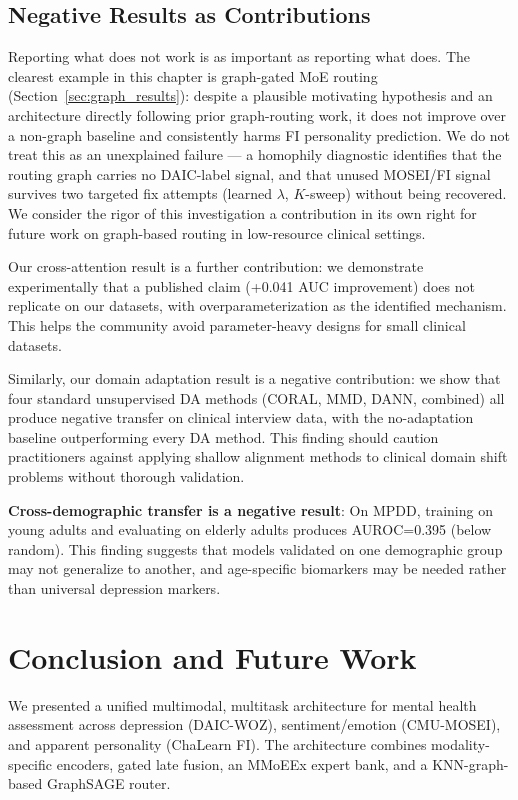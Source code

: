 \documentclass[12pt,oneside]{book}
\begin{document}
\subsection{Negative Results as Contributions}

Reporting what does not work is as important as reporting what does. The clearest example in this chapter is graph-gated MoE routing (Section~\ref{sec:graph_results}): despite a plausible motivating hypothesis and an architecture directly following prior graph-routing work, it does not improve over a non-graph baseline and consistently harms FI personality prediction. We do not treat this as an unexplained failure — a homophily diagnostic identifies that the routing graph carries no DAIC-label signal, and that unused MOSEI/FI signal survives two targeted fix attempts (learned $\lambda$, $K$-sweep) without being recovered. We consider the rigor of this investigation a contribution in its own right for future work on graph-based routing in low-resource clinical settings.

Our cross-attention result is a further contribution: we demonstrate experimentally that a published claim (+0.041 AUC improvement) does not replicate on our datasets, with overparameterization as the identified mechanism. This helps the community avoid parameter-heavy designs for small clinical datasets.

Similarly, our domain adaptation result is a negative contribution: we show that four standard unsupervised DA methods (CORAL, MMD, DANN, combined) all produce negative transfer on clinical interview data, with the no-adaptation baseline outperforming every DA method. This finding should caution practitioners against applying shallow alignment methods to clinical domain shift problems without thorough validation.

\textbf{Cross-demographic transfer is a negative result}: On MPDD, training on young adults and evaluating on elderly adults produces AUROC=0.395 (below random). This finding suggests that models validated on one demographic group may not generalize to another, and age-specific biomarkers may be needed rather than universal depression markers.

\section{Conclusion and Future Work}
\label{sec:conclusion}
We presented a unified multimodal, multitask architecture for mental health assessment across depression (DAIC-WOZ), sentiment/emotion (CMU-MOSEI), and apparent personality (ChaLearn FI). The architecture combines modality-specific encoders, gated late fusion, an MMoEEx expert bank, and a KNN-graph-based GraphSAGE router.
\end{document}
